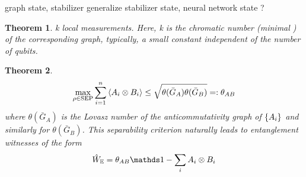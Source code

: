 \documentclass[
10pt,
aps,
pra,
linenumbers,
floatfix,
]{revtex4-2}
\theoremstyle{plain}
\newtheorem{theorem}{Theorem}
\newtheorem{proposition}{Proposition}
\theoremstyle{definition}
\newcommand{\ew}{\hat{W}}
\newcommand{\dm}{\rho}
\begin{document}
graph state, stabilizer \cite{zhouDetectingMultipartiteEntanglement2019}
generalize \cite{zhangEfficientEntanglementGeneration2021}
stabilizer state, neural network state \cite{gaoEfficientRepresentationQuantum2017}?

\begin{theorem}
	k local measurements. Here, k is the chromatic number (minimal ) of the corresponding graph, typically, a small constant independent of the number of qubits.
\end{theorem}
\begin{theorem}
	\cite{degoisUncertaintyRelationsGraph2022}
	\begin{equation}
		\max_{\dm\in \text{SEP}} \sum_{i=1}^n \expval{A_i \otimes B_i}
		\le \sqrt{\theta(\bar{G}_A) \theta(\bar{G}_B)} = : \theta_{AB}
	\end{equation}
	where $\theta(\bar{G}_A)$ is the Lovasz number of the anticommutativity graph of $\qty{A_i}$ and similarly for $\theta(\bar{G}_B)$.
	This separability criterion naturally leads to entanglement witnesses of the form 
	\begin{equation}
		\ew_{\mathbb{E}} = \theta_{AB} \identity - \sum_i A_i \otimes B_i
	\end{equation}
\end{theorem}
\end{document}
